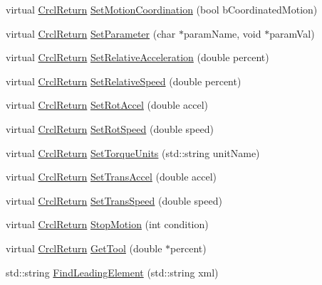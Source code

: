 \begin{DoxyCompactItemize}
\item 
virtual \hyperlink{namespaceCrcl_a1ed3b29723118a020251dde9b12733c0}{Crcl\-Return} \hyperlink{classCrcl_1_1CrclDelegateInterface_aa0d4f4101f60374097d50126c35bcc74}{Set\-Motion\-Coordination} (bool b\-Coordinated\-Motion)
\item 
virtual \hyperlink{namespaceCrcl_a1ed3b29723118a020251dde9b12733c0}{Crcl\-Return} \hyperlink{classCrcl_1_1CrclDelegateInterface_a961922ae3370ba783a6efd49c60b2615}{Set\-Parameter} (char $\ast$param\-Name, void $\ast$param\-Val)
\item 
virtual \hyperlink{namespaceCrcl_a1ed3b29723118a020251dde9b12733c0}{Crcl\-Return} \hyperlink{classCrcl_1_1CrclDelegateInterface_a75b341b2b89b4e2c8994f0f8f9090a8c}{Set\-Relative\-Acceleration} (double percent)
\item 
virtual \hyperlink{namespaceCrcl_a1ed3b29723118a020251dde9b12733c0}{Crcl\-Return} \hyperlink{classCrcl_1_1CrclDelegateInterface_ae3862f5c58782fcd5105af10975432d0}{Set\-Relative\-Speed} (double percent)
\item 
virtual \hyperlink{namespaceCrcl_a1ed3b29723118a020251dde9b12733c0}{Crcl\-Return} \hyperlink{classCrcl_1_1CrclDelegateInterface_afc10167b3d7468331c434b60b7f8f737}{Set\-Rot\-Accel} (double accel)
\item 
virtual \hyperlink{namespaceCrcl_a1ed3b29723118a020251dde9b12733c0}{Crcl\-Return} \hyperlink{classCrcl_1_1CrclDelegateInterface_ab27eaeb82b7b859cf17addcade824829}{Set\-Rot\-Speed} (double speed)
\item 
virtual \hyperlink{namespaceCrcl_a1ed3b29723118a020251dde9b12733c0}{Crcl\-Return} \hyperlink{classCrcl_1_1CrclDelegateInterface_addfaf2d1240dcca39c813c1de09f81a1}{Set\-Torque\-Units} (std\-::string unit\-Name)
\item 
virtual \hyperlink{namespaceCrcl_a1ed3b29723118a020251dde9b12733c0}{Crcl\-Return} \hyperlink{classCrcl_1_1CrclDelegateInterface_a897b31164e969c95bc8e0ba516c0aca8}{Set\-Trans\-Accel} (double accel)
\item 
virtual \hyperlink{namespaceCrcl_a1ed3b29723118a020251dde9b12733c0}{Crcl\-Return} \hyperlink{classCrcl_1_1CrclDelegateInterface_a957f09eff572d3175cd045c492f521b6}{Set\-Trans\-Speed} (double speed)
\item 
virtual \hyperlink{namespaceCrcl_a1ed3b29723118a020251dde9b12733c0}{Crcl\-Return} \hyperlink{classCrcl_1_1CrclDelegateInterface_a0f1326fca669d46ea7be5ac08c59f645}{Stop\-Motion} (int condition)
\item 
virtual \hyperlink{namespaceCrcl_a1ed3b29723118a020251dde9b12733c0}{Crcl\-Return} \hyperlink{classCrcl_1_1CrclDelegateInterface_afcee182e23a8ea376fa1fa829336feb0}{Get\-Tool} (double $\ast$percent)
\item 
std\-::string \hyperlink{classCrcl_1_1CrclDelegateInterface_a48005fdb22d24e47fe059a5085a34eed}{Find\-Leading\-Element} (std\-::string xml)
\end{DoxyCompactItemize}
